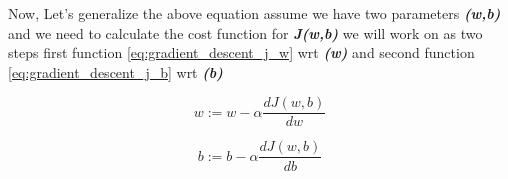 Now, Let's generalize the above equation assume we have two parameters  \textbf{\textit{(w,b)}} and we need to calculate the cost function for  \textbf{\textit{J(w,b)}} we will work on as two steps first function \eqref{eq:gradient_descent_j_w}  wrt \textbf{\textit{(w)}} and second function \eqref{eq:gradient_descent_j_b} wrt \textbf{\textit{(b)}}

\begin{equation}\label{eq:gradient_descent_j_w}
      w := w - \alpha \frac{dJ(w,b)}{dw}
  \end{equation}

\begin{equation}\label{eq:gradient_descent_j_b}
      b := b - \alpha \frac{dJ(w,b)}{db}
  \end{equation}













